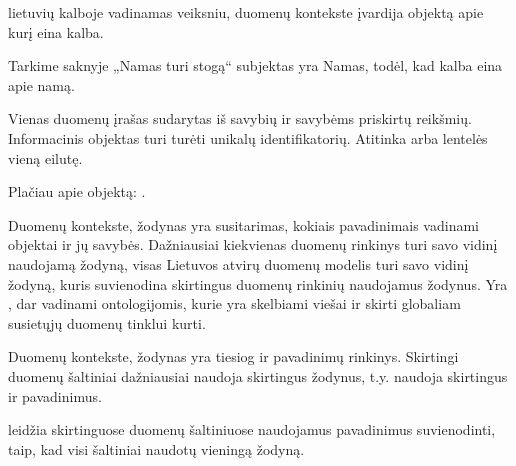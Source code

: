 \documentclass[letterpaper,10pt,lithuanian]{sphinxmanual}
\begin{document}
\begin{description}
\sphinxAtStartPar
{} lietuvių kalboje vadinamas veiksniu, duomenų kontekste
įvardija objektą apie kurį eina kalba.

\sphinxAtStartPar
Tarkime saknyje „Namas turi stogą“ subjektas yra Namas, todėl, kad
kalba eina apie namą.

\sphinxAtStartPar
Vienas duomenų įrašas sudarytas iš savybių ir savybėms priskirtų
reikšmių. Informacinis objektas turi turėti unikalų identifikatorių.
Atitinka  arba lentelės vieną eilutę.

\sphinxAtStartPar
Plačiau apie objektą: {\hyperref[\detokenize{modelis:objektas}]{}}.

\sphinxAtStartPar
Duomenų kontekste, žodynas yra susitarimas, kokiais pavadinimais
vadinami objektai ir jų savybės. Dažniausiai kiekvienas duomenų rinkinys
turi savo vidinį naudojamą žodyną, visas Lietuvos atvirų duomenų modelis
turi savo vidinį žodyną, kuris suvienodina skirtingus duomenų rinkinių
naudojamus žodynus. Yra {\hyperref[\detokenize{savokos:term-viesasis-zodynas}]{}}, dar
vadinami ontologijomis, kurie yra skelbiami viešai ir skirti globaliam
susietųjų duomenų tinklui kurti.

\sphinxAtStartPar
Duomenų kontekste, žodynas yra tiesiog {\hyperref[\detokenize{savokos:term-modelis}]{}} ir
{\hyperref[\detokenize{savokos:term-savybe}]{}} pavadinimų rinkinys. Skirtingi duomenų
šaltiniai dažniausiai naudoja skirtingus žodynus, t.y. naudoja
skirtingus {\hyperref[\detokenize{savokos:term-modelis}]{}} ir {\hyperref[\detokenize{savokos:term-savybe}]{}}
pavadinimus.

\sphinxAtStartPar
{\hyperref[\detokenize{savokos:term-DSA}]{}} leidžia skirtinguose duomenų
šaltiniuose naudojamus pavadinimus suvienodinti, taip, kad visi
šaltiniai naudotų vieningą žodyną.


\end{description}
\end{document}

